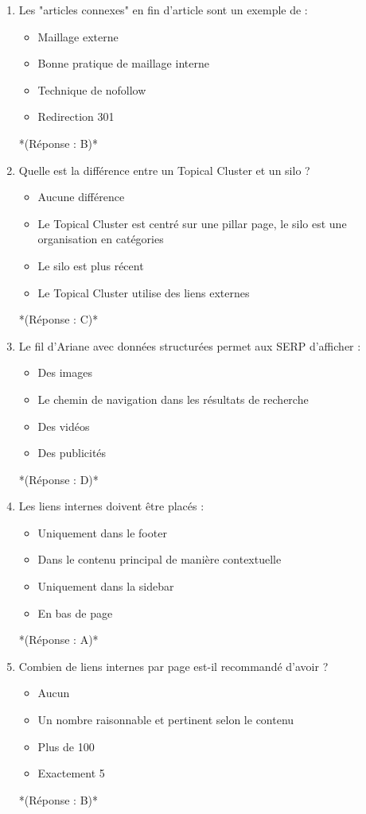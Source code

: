 \documentclass[12pt,a4paper,twoside]{report}
\begin{document}
\begin{enumerate}
\item Les "articles connexes" en fin d'article sont un exemple de :
\begin{itemize}
\item[A)] Maillage externe
\item[B)] Bonne pratique de maillage interne
\item[C)] Technique de nofollow
\item[D)] Redirection 301
\end{itemize}
*(Réponse : B)*

\item Quelle est la différence entre un Topical Cluster et un silo ?
\begin{itemize}
\item[A)] Aucune différence
\item[B)] Le Topical Cluster est centré sur une pillar page, le silo est une organisation en catégories
\item[C)] Le silo est plus récent
\item[D)] Le Topical Cluster utilise des liens externes
\end{itemize}
*(Réponse : C)*

\item Le fil d'Ariane avec données structurées permet aux SERP d'afficher :
\begin{itemize}
\item[A)] Des images
\item[B)] Le chemin de navigation dans les résultats de recherche
\item[C)] Des vidéos
\item[D)] Des publicités
\end{itemize}
*(Réponse : D)*

\item Les liens internes doivent être placés :
\begin{itemize}
\item[A)] Uniquement dans le footer
\item[B)] Dans le contenu principal de manière contextuelle
\item[C)] Uniquement dans la sidebar
\item[D)] En bas de page
\end{itemize}
*(Réponse : A)*

\item Combien de liens internes par page est-il recommandé d'avoir ?
\begin{itemize}
\item[A)] Aucun
\item[B)] Un nombre raisonnable et pertinent selon le contenu
\item[C)] Plus de 100
\item[D)] Exactement 5
\end{itemize}
*(Réponse : B)*


\end{enumerate}
\end{document}
